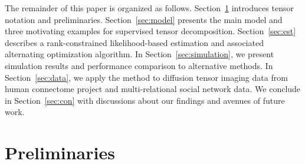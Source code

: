 \documentclass[12pt]{article}
\theoremstyle{plain}
\theoremstyle{definition}
\begin{document}
The remainder of this paper is organized as follows. Section~\ref{sec:pre} introduces tensor notation and preliminaries. Section~\ref{sec:model} presents the main model and three motivating examples for supervised tensor decomposition. Section~\ref{sec:est} describes a rank-constrained likelihood-based estimation and associated alternating optimization algorithm. In Section~\ref{sec:simulation}, we present simulation results and performance comparison to alternative methods. In Section~\ref{sec:data}, we apply the method to diffusion tensor imaging data from human connectome project and multi-relational social network data. We conclude in Section~\ref{sec:con} with discussions about our findings and avenues of future work.

\section{Preliminaries}\label{sec:pre}
\end{document}
